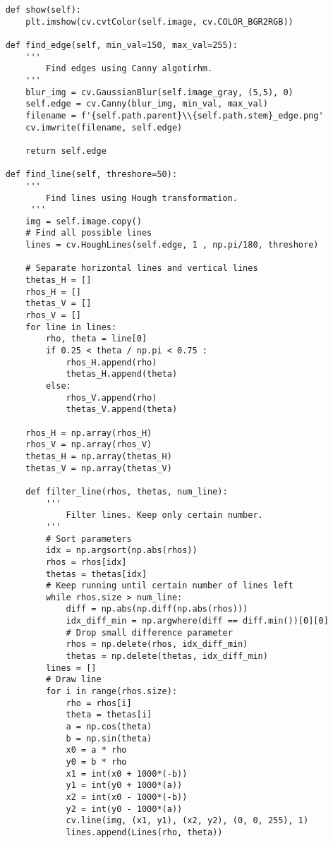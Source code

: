 \documentclass[11pt]{article}
\begin{document}
\begin{lstlisting}
    def show(self):
        plt.imshow(cv.cvtColor(self.image, cv.COLOR_BGR2RGB))
    
    def find_edge(self, min_val=150, max_val=255):
        ''' 
            Find edges using Canny algotirhm.
        '''
        blur_img = cv.GaussianBlur(self.image_gray, (5,5), 0)
        self.edge = cv.Canny(blur_img, min_val, max_val)
        filename = f'{self.path.parent}\\{self.path.stem}_edge.png'
        cv.imwrite(filename, self.edge)

        return self.edge

    def find_line(self, threshore=50):
        '''
            Find lines using Hough transformation.
         '''
        img = self.image.copy()
        # Find all possible lines
        lines = cv.HoughLines(self.edge, 1 , np.pi/180, threshore)

        # Separate horizontal lines and vertical lines
        thetas_H = []
        rhos_H = []
        thetas_V = []
        rhos_V = []
        for line in lines:
            rho, theta = line[0]
            if 0.25 < theta / np.pi < 0.75 :
                rhos_H.append(rho)
                thetas_H.append(theta)
            else:
                rhos_V.append(rho)
                thetas_V.append(theta)

        rhos_H = np.array(rhos_H)
        rhos_V = np.array(rhos_V)
        thetas_H = np.array(thetas_H)
        thetas_V = np.array(thetas_V)

        def filter_line(rhos, thetas, num_line):
            '''
                Filter lines. Keep only certain number.
            '''
            # Sort parameters
            idx = np.argsort(np.abs(rhos))
            rhos = rhos[idx]
            thetas = thetas[idx]
            # Keep running until certain number of lines left
            while rhos.size > num_line:
                diff = np.abs(np.diff(np.abs(rhos)))
                idx_diff_min = np.argwhere(diff == diff.min())[0][0]
                # Drop small difference parameter
                rhos = np.delete(rhos, idx_diff_min)
                thetas = np.delete(thetas, idx_diff_min)
            lines = []
            # Draw line
            for i in range(rhos.size):
                rho = rhos[i]
                theta = thetas[i]
                a = np.cos(theta)
                b = np.sin(theta)
                x0 = a * rho
                y0 = b * rho
                x1 = int(x0 + 1000*(-b))
                y1 = int(y0 + 1000*(a))
                x2 = int(x0 - 1000*(-b))
                y2 = int(y0 - 1000*(a))
                cv.line(img, (x1, y1), (x2, y2), (0, 0, 255), 1)
                lines.append(Lines(rho, theta))


\end{lstlisting}
\end{document}
